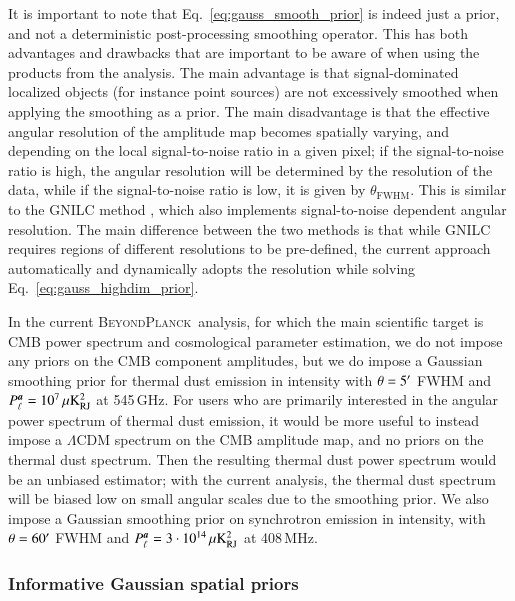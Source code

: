 \documentclass[twocolumn]{aa}
\renewcommand{\a}[0]{\vec{a}}
\newcommand{\BP}{\textsc{BeyondPlanck}}
\begin{document}
It is important to note that Eq.~\eqref{eq:gauss_smooth_prior} is
indeed just a prior, and not a deterministic post-processing smoothing
operator. This has both advantages and drawbacks that are important to
be aware of when using the products from the analysis. The main
advantage is that signal-dominated localized objects (for instance
point sources) are not excessively smoothed when applying the
smoothing as a prior. The main disadvantage is that the effective
angular resolution of the amplitude map becomes spatially varying, and
depending on the local signal-to-noise ratio in a given pixel; if the
signal-to-noise ratio is high, the angular resolution will be
determined by the resolution of the data, while if the signal-to-noise
ratio is low, it is given by $\theta_{\mathrm{FWHM}}$. This is similar
to the GNILC method \citep{Remazeilles2011b}, which also implements
signal-to-noise dependent angular resolution. The main difference
between the two methods is that while GNILC requires regions of
different resolutions to be pre-defined, the current approach
automatically and dynamically adopts the resolution while solving
Eq.~\eqref{eq:gauss_highdim_prior}.

In the current \BP\ analysis, for which the main scientific target is
CMB power spectrum and cosmological parameter estimation, we do not
impose any priors on the CMB component amplitudes, but we do impose a
Gaussian smoothing prior for thermal dust emission in intensity with
$\theta=5\arcm$ FWHM and $P_{\ell}^{\a} = 10^7\muK_{\mathrm{RJ}}^2$ at
545\,GHz. For users who are primarily interested in the angular power
spectrum of thermal dust emission, it would be more useful to instead
impose a $\Lambda$CDM spectrum on the CMB amplitude map, and no priors
on the thermal dust spectrum. Then the resulting thermal dust power
spectrum would be an unbiased estimator; with the current analysis,
the thermal dust spectrum will be biased low on small angular scales
due to the smoothing prior. We also impose a Gaussian smoothing prior
on synchrotron emission in intensity, with $\theta=60\arcm$ FWHM and
$P_{\ell}^{\a} = 3\cdot 10^{14}\muK_{\mathrm{RJ}}^2$ at 408\,MHz.

\subsubsection{Informative Gaussian spatial priors}
\end{document}
